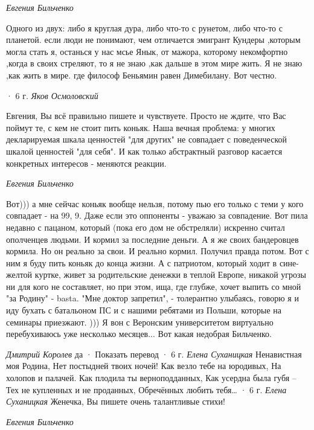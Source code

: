 \emph{Евгения Бильченко}

Одного из двух: либо я круглая дура, либо что-то с рунетом, либо что-то с
планетой. если люди не понимают, чем отличается эмигрант Кундеры ,которым могла
стать я, останься у нас мсье Янык, от мажора, которому некомфортно ,когда в
своих стреляют, то я не знаю ,как дальше в этом мире жить. Я не знаю ,как жить
в мире. где философ Беньямин равен Димебилану. Вот честно.

 · 6 г.
\emph{Яков Осмоловский}

Евгения, Вы всё правильно пишете и чувствуете. Просто не ждите, что Вас поймут
те, с кем не стоит пить коньяк. Наша вечная проблема: у многих декларируемая
шкала ценностей "для других" не совпадает с поведенческой шкалой ценностей "для
себя". И как только абстрактный разговор касается конкретных интересов -
меняются реакции.

\emph{Евгения Бильченко}

Вот))) а мне сейчас коньяк вообще нельзя, потому пью его только с теми у кого
совпадает - на 99, 9. Даже если это оппоненты - уважаю за совпадение. Вот пила
недавно с пацаном, который (пока его дом не обстреляли) искренно считал
ополченцев людьми. И кормил за последние деньги. А я же своих бандеровцев
кормила. Но он реально за свои. И реально кормил. Получил правда потом. Вот с
ним я буду пить коньяк до конца жизни. А с патриотом, который ходит в
сине-желтой куртке, живет за родительские денежки в теплой Европе, никакой
угрозы ни для кого не составляет, но при этом, ища, где глубже, хочет выпить со
мной "за Родину" - basta. "Мне доктор запретил", - толерантно улыбаясь, говорю
я и иду бухать с батальоном ПС и с нашими ребятами из Польши, которые на
семинары приезжают. ))) Я вон с Веронским университетом виртуально
перебухиваюсь уже несколько месяцев... Вот какая недобрая Бильченко.

\emph{Дмитрий Королев}
да
 · Показать перевод · 6 г.
\emph{Елена Суханицкая}
Ненавистная моя Родина,
Нет постыдней твоих ночей!
Как везло тебе на юродивых,
На холопов и палачей.
Как плодила ты верноподданных,
Как усердна была губя –
Тех не купленных и не проданных,
Обречённых любить тебя…
 · 6 г.
\emph{Елена Суханицкая}
Женечка, Вы пишете очень талантливые стихи!

\emph{Евгения Бильченко}

